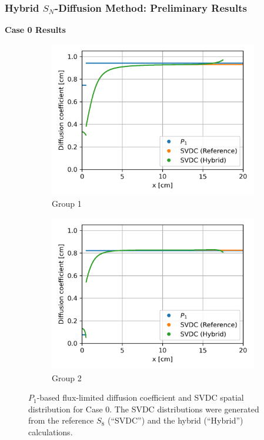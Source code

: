 \begin{frame}
  \frametitle{Hybrid $S_N$-Diffusion Method: Preliminary Results}
  \textbf{Case 0 Results}
  \begin{figure}[htb!]
    \centering
    \begin{subfigure}[b]{.49\textwidth}
      \centering
      \includegraphics[width=\textwidth]{../images/case-0-group-1-hybrid-diffcoef}
      \caption{Group 1}
      \label{fig:c0g1hd}
    \end{subfigure}
    \hfill
    \begin{subfigure}[b]{.49\textwidth}
      \centering
      \includegraphics[width=\textwidth]{../images/case-0-group-2-hybrid-diffcoef}
      \caption{Group 2}
      \label{fig:c0g2hd}
    \end{subfigure}
    \caption{$P_1$-based flux-limited diffusion coefficient and \gls{SVDC} spatial distribution for
    Case 0. The \gls{SVDC} distributions were generated from the reference $S_8$ (``SVDC'') and the
    hybrid (``Hybrid'') calculations.}
    \label{fig:c0hd}
  \end{figure}
\end{frame}

